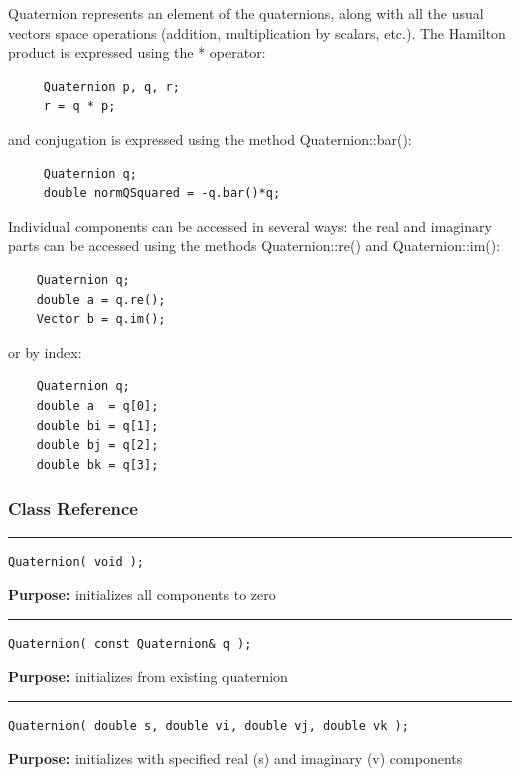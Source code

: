 \documentclass{article}
\begin{document}
 

 Quaternion represents an element of the quaternions, along with all the usual vectors space operations (addition, multiplication by scalars, etc.).  The Hamilton product is expressed using the * operator: 

 \begin{verbatim}
     Quaternion p, q, r;
     r = q * p;
 \end{verbatim}
\vspace{-\baselineskip} and conjugation is expressed using the method Quaternion::bar(): 

 \begin{verbatim}
     Quaternion q;
     double normQSquared = -q.bar()*q;
 \end{verbatim}
\vspace{-\baselineskip} Individual components can be accessed in several ways: the real and imaginary parts can be accessed using the methods Quaternion::re() and Quaternion::im(): 

 \begin{verbatim}
    Quaternion q;
    double a = q.re();
    Vector b = q.im();
 \end{verbatim}
\vspace{-\baselineskip} or by index: 

 \begin{verbatim}
    Quaternion q;
    double a  = q[0];
    double bi = q[1];
    double bj = q[2];
    double bk = q[3];
 \end{verbatim}
\vspace{-\baselineskip}

\subsubsection{Class Reference}

\rule{5in}{1pt}
\begin{verbatim}
Quaternion( void );
\end{verbatim}
\textbf{Purpose:}
initializes all components to zero

\hspace{-.21in}\rule{5in}{1pt}
\begin{verbatim}
Quaternion( const Quaternion& q );
\end{verbatim}
\textbf{Purpose:}
initializes from existing quaternion

\hspace{-.21in}\rule{5in}{1pt}
\begin{verbatim}
Quaternion( double s, double vi, double vj, double vk );
\end{verbatim}
\textbf{Purpose:}
initializes with specified real (s) and imaginary (v) components
\end{document}
